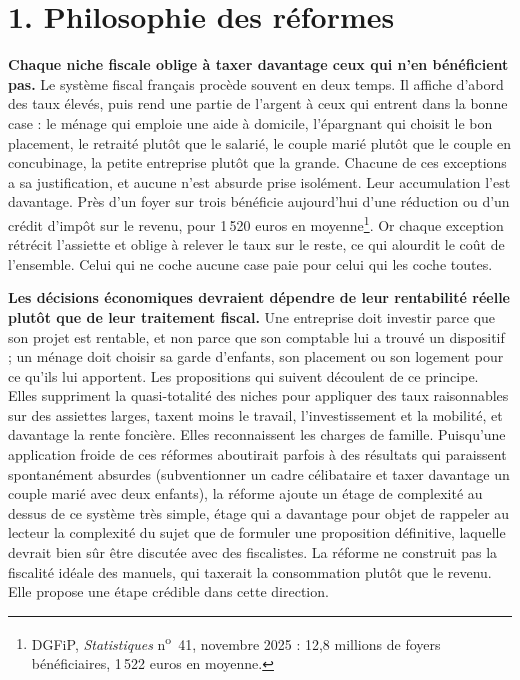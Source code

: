 \documentclass[10pt,a4paper]{article}
\begin{document}
\section{1. Philosophie des réformes}

\textbf{Chaque niche fiscale oblige à taxer davantage ceux qui n'en bénéficient pas.} Le système fiscal français procède
souvent en deux temps. Il affiche d'abord des taux élevés, puis rend une partie de l'argent à ceux qui entrent dans la
bonne case : le ménage qui emploie une aide à domicile, l'épargnant qui choisit le bon placement, le retraité plutôt que
le salarié, le couple marié plutôt que le couple en concubinage, la petite entreprise plutôt que la grande. Chacune de
ces exceptions a sa justification, et aucune n'est absurde prise isolément. Leur accumulation l'est davantage. Près
d'un foyer sur trois bénéficie aujourd'hui d'une réduction ou d'un crédit d'impôt sur le revenu, pour 1\,520 euros en
moyenne\footnote{DGFiP, \emph{Statistiques} n\textsuperscript{o}~41, novembre 2025 : 12,8 millions de foyers bénéficiaires, 1\,522 euros en moyenne.}. Or chaque exception rétrécit l'assiette et
oblige à relever le taux sur le reste, ce qui alourdit le coût de l'ensemble. Celui qui ne coche aucune case paie pour
celui qui les coche toutes.

\textbf{Les décisions économiques devraient dépendre de leur rentabilité réelle plutôt que de leur traitement
fiscal.} Une entreprise doit investir parce que son projet est rentable, et non parce que son comptable lui a trouvé un
dispositif ; un ménage doit choisir sa garde d'enfants, son placement ou son logement pour ce qu'ils lui apportent. Les
propositions qui suivent découlent de ce principe. Elles suppriment la quasi-totalité des niches pour appliquer des taux
raisonnables sur des assiettes larges, taxent moins le travail, l'investissement et la mobilité, et davantage la rente
foncière. Elles reconnaissent les charges de famille. Puisqu'une application froide de ces réformes aboutirait parfois à des résultats qui paraissent spontanément absurdes (subventionner un cadre célibataire et taxer davantage un couple marié avec deux enfants), la réforme ajoute un étage de complexité au dessus de ce système très simple, étage qui a davantage pour objet de rappeler au lecteur la complexité du sujet que de formuler une proposition définitive, laquelle devrait bien sûr être discutée avec des fiscalistes. La réforme ne construit pas la fiscalité idéale des
manuels, qui taxerait la consommation plutôt que le revenu. Elle propose une étape crédible dans cette direction.
\end{document}
